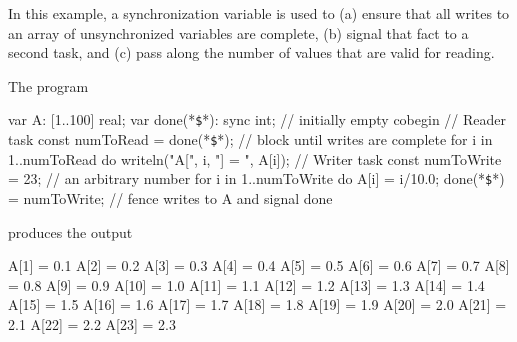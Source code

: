 
\begin{example}
  In this example, a synchronization variable is used to (a) ensure that
  all writes to an array of unsynchronized variables are complete, (b)
  signal that fact to a second task, and (c) pass along the number of
  values that are valid for reading.

  The program
\begin{chapel}
var A: [1..100] real;
var done(*\texttt{\$}*): sync int;           // initially empty
cobegin {
  { // Reader task
    const numToRead = done(*\texttt{\$}*);   // block until writes are complete
    for i in 1..numToRead do
      writeln("A[", i, "] = ", A[i]);
  }
  {  // Writer task
    const numToWrite = 23;     // an arbitrary number
    for i in 1..numToWrite do
      A[i] = i/10.0;
    done(*\texttt{\$}*) = numToWrite;        // fence writes to A and signal done
  }
}
\end{chapel}
  produces the output
\begin{chapelprintoutput}{}
A[1] = 0.1
A[2] = 0.2
A[3] = 0.3
A[4] = 0.4
A[5] = 0.5
A[6] = 0.6
A[7] = 0.7
A[8] = 0.8
A[9] = 0.9
A[10] = 1.0
A[11] = 1.1
A[12] = 1.2
A[13] = 1.3
A[14] = 1.4
A[15] = 1.5
A[16] = 1.6
A[17] = 1.7
A[18] = 1.8
A[19] = 1.9
A[20] = 2.0
A[21] = 2.1
A[22] = 2.2
A[23] = 2.3
\end{chapelprintoutput}
\end{example}


